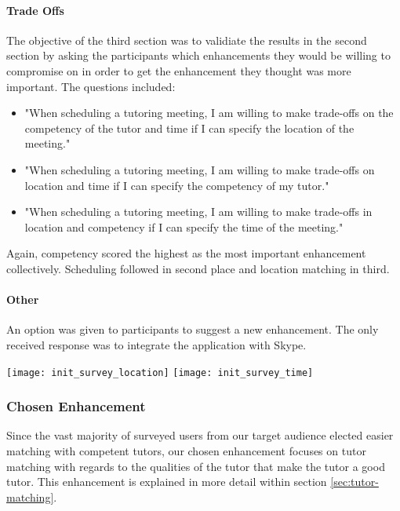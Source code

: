 \paragraph{Trade Offs} The objective of the third section was to
validiate the results in the second section by asking the participants
which enhancements they would be willing to compromise on in order to
get the enhancement they thought was more important. The questions
included:
\begin{itemize}
  \item "When scheduling a tutoring meeting, I am willing to make
trade-offs on the competency of the tutor and time if I can specify
the location of the meeting."
  \item "When scheduling a tutoring meeting, I am willing to make
trade-offs on location and time if I can specify the competency of my
tutor."
  \item "When scheduling a tutoring meeting, I am willing to make
trade-offs in location and competency if I can specify the time of the
meeting."
\end{itemize} Again, competency scored the highest as the most
important enhancement collectively. Scheduling followed in second
place and location matching in third.

\paragraph{Other} An option was given to participants to suggest a new
enhancement. The only received response was to integrate the
application with Skype.

\begin{figure*}[ht]
  \centering
    \texttt{[image: init\_survey\_location]}
    \texttt{[image: init\_survey\_time]}
\end{figure*}

\subsubsection{Chosen Enhancement}
Since the vast majority of surveyed users from our target audience 
elected easier matching with competent tutors, our chosen enhancement
focuses on tutor matching with regards to the qualities of the tutor that 
make the tutor a good tutor. This enhancement is explained in more detail within section \ref{sec:tutor-matching}.

